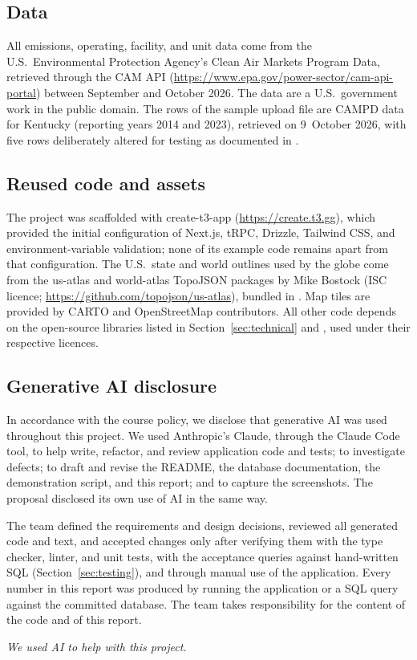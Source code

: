 \documentclass[11pt,a4paper]{article}
\begin{document}
\subsection{Data}

All emissions, operating, facility, and unit data come from the U.S.\ Environmental Protection
Agency's Clean Air Markets Program Data, retrieved through the CAM API
(\url{https://www.epa.gov/power-sector/cam-api-portal}) between September and October 2026.
The data are a U.S.\ government work in the public domain. The rows of the sample upload file
are CAMPD data for Kentucky (reporting years 2014 and 2023), retrieved on 9~October 2026, with
five rows deliberately altered for testing as documented in .

\subsection{Reused code and assets}

The project was scaffolded with create-t3-app (\url{https://create.t3.gg}), which provided the
initial configuration of Next.js, tRPC, Drizzle, Tailwind CSS, and environment-variable
validation; none of its example code remains apart from that configuration. The U.S.\ state and
world outlines used by the globe come from the us-atlas and world-atlas TopoJSON packages by
Mike Bostock (ISC licence; \url{https://github.com/topojson/us-atlas}), bundled in
. Map tiles are provided by CARTO and OpenStreetMap contributors. All other
code depends on the open-source libraries listed in Section~\ref{sec:technical} and
, used under their respective licences.

\subsection{Generative AI disclosure}

In accordance with the course policy, we disclose that generative AI was used throughout this
project. We used Anthropic's Claude, through the Claude Code tool, to help write, refactor, and
review application code and tests; to investigate defects; to draft and revise the README, the
database documentation, the demonstration script, and this report; and to capture the
screenshots. The proposal disclosed its own use of AI in the same way.

The team defined the requirements and design decisions, reviewed all generated code and text,
and accepted changes only after verifying them with the type checker, linter, and unit tests,
with the acceptance queries against hand-written SQL (Section~\ref{sec:testing}), and through
manual use of the application. Every number in this report was produced by running the
application or a SQL query against the committed database. The team takes responsibility for
the content of the code and of this report.

\renewcommand{\refname}{Bibliography}



\vfill
\noindent\textit{We used AI to help with this project.}
\end{document}
